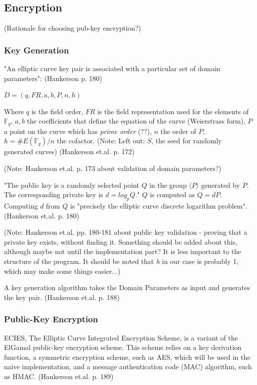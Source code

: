 \subsection{Encryption}

(Rationale for choosing pub-key encryption?)

\subsubsection{Key Generation}

"An elliptic curve key pair is associated with a particular set of domain parameters": (Hankerson p. 180)

\( D = (q,FR,a,b,P,n,h) \)

Where \(q\) is the field order, \(FR\) is the field representation used for the elements of \( \mathbb{ F }_q \),
\(a, b\) the coefficients that define the equation of the curve (Weierstrass form), \(P\) a point on the curve which
has \emph{prime order} (??), \(n\) the order of \(P\), \(h = \#E(\mathbb{F}_q) / n\) the cofactor. (Note: Left out:
\(S\), the seed for randomly generated curves) (Hankerson et.al. p. 172)

(Note: Hankerson et.al. p. 173 about validation of domain parameters?)

"The public key is a randomly selected point \(Q\) in the group \( \langle P \rangle \) generated by \(P\). The corresponding
private key is \(d = log_p Q\)." \(Q\) is computed as \(Q = dP\). Computing \(d\) from \(Q\) is "precisely the elliptic curve
discrete logarithm problem". (Hankerson et.al. p. 180)

(Note: Hankerson et.al. pp. 180-181 about public key validation - proving that a private key exists, without finding it. Something
should be added about this, although maybe not until the implementation part? It is less important to the structure of the program.
It should be noted that \emph{h} in our case is probably 1, which may make some things easier...)

A key generation algorithm takes the Domain Parameters as input and generates the key pair. (Hankerson et.al. p. 188)

\subsubsection{Public-Key Encryption}

ECIES, The Elliptic Curve Integrated Encryption Scheme, is a variant of the ElGamal public-key encryption scheme. This scheme relies
on a key derivation function, a symmetric encryption scheme, such as AES, which will be used in the naive implementation, and a
message authentication code (MAC) algorithm, such as HMAC. (Hankerson et.al. p. 189)

